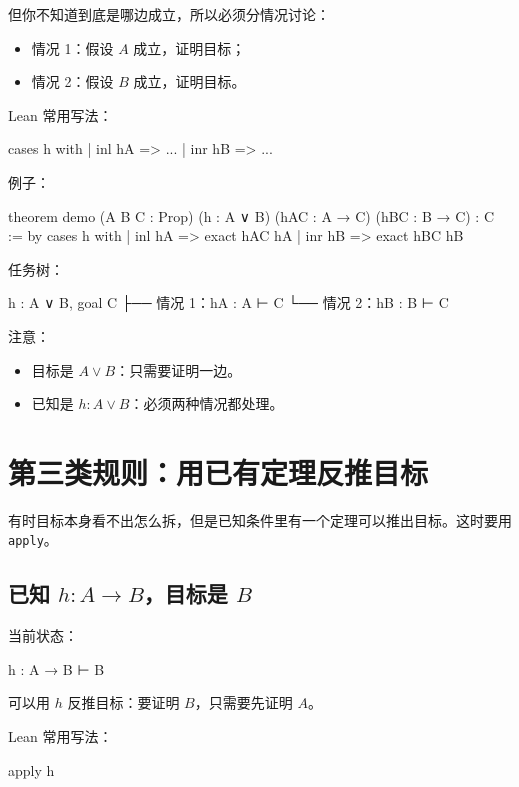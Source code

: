\documentclass[UTF8,12pt]{ctexart}
\begin{document}
但你不知道到底是哪边成立，所以必须分情况讨论：
\begin{itemize}
  \item 情况 1：假设 \(A\) 成立，证明目标；
  \item 情况 2：假设 \(B\) 成立，证明目标。
\end{itemize}

Lean 常用写法：

\begin{LeanCode}
cases h with
| inl hA =>
  ...
| inr hB =>
  ...
\end{LeanCode}

例子：

\begin{LeanCode}
theorem demo
  (A B C : Prop)
  (h : A ∨ B)
  (hAC : A → C)
  (hBC : B → C) :
  C := by
  cases h with
  | inl hA =>
    exact hAC hA
  | inr hB =>
    exact hBC hB
\end{LeanCode}

任务树：

\begin{Tree}
h : A ∨ B, goal C
├── 情况 1：hA : A ⊢ C
└── 情况 2：hB : B ⊢ C
\end{Tree}

注意：
\begin{itemize}
  \item 目标是 \(A \lor B\)：只需要证明一边。
  \item 已知是 \(h : A \lor B\)：必须两种情况都处理。
\end{itemize}

\section{第三类规则：用已有定理反推目标}

有时目标本身看不出怎么拆，但是已知条件里有一个定理可以推出目标。这时要用 \texttt{apply}。

\subsection{已知 \(h : A \to B\)，目标是 \(B\)}

当前状态：

\begin{LeanCode}
h : A → B
⊢ B
\end{LeanCode}

可以用 \(h\) 反推目标：要证明 \(B\)，只需要先证明 \(A\)。

Lean 常用写法：

\begin{LeanCode}
apply h
\end{LeanCode}
\end{document}
